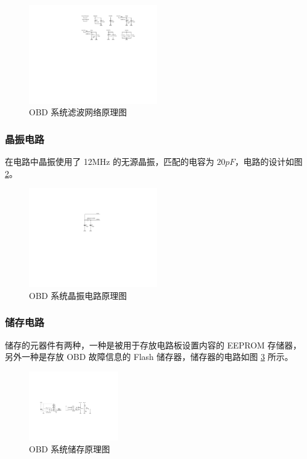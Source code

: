 \begin{figure}
	\centering
	\includegraphics[width=0.5\textwidth]{figures/filtering-SCH.pdf}
	\caption{OBD 系统滤波网络原理图}\label{fig:filtering-SCH}
\end{figure}

\subsubsection{晶振电路}

在电路中晶振使用了 12MHz 的无源晶振，匹配的电容为 $20pF$，电路的设计如图 \ref{fig:XCSIO-SCH}。

\begin{figure}
	\centering
	\includegraphics[width=0.5\textwidth]{figures/XCSIO-SCH.pdf}
	\caption{OBD 系统晶振电路原理图}\label{fig:XCSIO-SCH}
\end{figure}

\subsubsection{储存电路}
储存的元器件有两种，一种是被用于存放电路板设置内容的 EEPROM 存储器，另外一种是存放 OBD 故障信息的 Flash 储存器，储存器的电路如图 \ref{fig:EEPROM-SCH} 所示。

\begin{figure}
	\centering
	\includegraphics[width=0.35\textwidth]{figures/EEPROM-SCH.pdf}
	\caption{OBD 系统储存原理图}\label{fig:EEPROM-SCH}
\end{figure}

